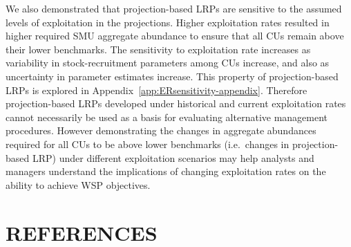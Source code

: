 \documentclass[11pt]{book}
\begin{document}
We also demonstrated that projection-based LRPs are sensitive to the assumed levels of exploitation in the projections. Higher exploitation rates resulted in higher required SMU aggregate abundance to ensure that all CUs remain above their lower benchmarks. The sensitivity to exploitation rate increases as variability in stock-recruitment parameters among CUs increase, and also as uncertainty in parameter estimates increase. This property of projection-based LRPs is explored in Appendix~\ref{app:ERsensitivity-appendix}. Therefore projection-based LRPs developed under historical and current exploitation rates cannot necessarily be used as a basis for evaluating alternative management procedures. However demonstrating the changes in aggregate abundances required for all CUs to be above lower benchmarks (i.e.~changes in projection-based LRP) under different exploitation scenarios may help analysts and managers understand the implications of changing exploitation rates on the ability to achieve WSP objectives.

\clearpage

\hypertarget{references}{%
\section{REFERENCES}\label{references}}

\noindent
\vspace{-2em}
\setlength{\parindent}{-0.2in}
\setlength{\leftskip}{0.2in}
\setlength{\parskip}{8pt}
\end{document}
